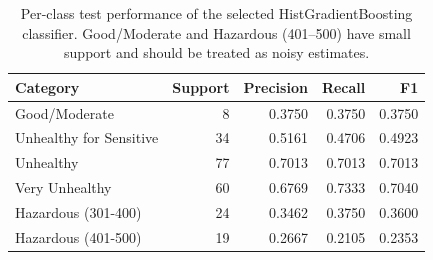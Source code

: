 \begin{table}[htbp]
\centering
\small
\caption{Per-class test performance of the selected HistGradientBoosting classifier. Good/Moderate and Hazardous (401--500) have small support and should be treated as noisy estimates.}
\label{tab:clf-per-class}
\begin{tabular}{lrrrr}
\toprule
Category & Support & Precision & Recall & F1 \\
\midrule
Good/Moderate & 8 & 0.3750 & 0.3750 & 0.3750 \\
Unhealthy for Sensitive & 34 & 0.5161 & 0.4706 & 0.4923 \\
Unhealthy & 77 & 0.7013 & 0.7013 & 0.7013 \\
Very Unhealthy & 60 & 0.6769 & 0.7333 & 0.7040 \\
Hazardous (301-400) & 24 & 0.3462 & 0.3750 & 0.3600 \\
Hazardous (401-500) & 19 & 0.2667 & 0.2105 & 0.2353 \\
\bottomrule
\end{tabular}

\end{table}
